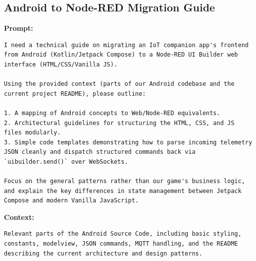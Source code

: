 \subsection*{Android to Node-RED Migration Guide}

\textbf{Prompt:}
\begin{lstlisting}[language={}, breaklines=true]
I need a technical guide on migrating an IoT companion app's frontend from Android (Kotlin/Jetpack Compose) to a Node-RED UI Builder web interface (HTML/CSS/Vanilla JS).

Using the provided context (parts of our Android codebase and the current project README), please outline:

1. A mapping of Android concepts to Web/Node-RED equivalents.
2. Architectural guidelines for structuring the HTML, CSS, and JS files modularly.
3. Simple code templates demonstrating how to parse incoming telemetry JSON cleanly and dispatch structured commands back via `uibuilder.send()` over WebSockets.

Focus on the general patterns rather than our game's business logic, and explain the key differences in state management between Jetpack Compose and modern Vanilla JavaScript.
\end{lstlisting}

\textbf{Context:}
\begin{lstlisting}[language={}, breaklines=true]
Relevant parts of the Android Source Code, including basic styling, constants, modelview, JSON commands, MQTT handling, and the README describing the current architecture and design patterns.
\end{lstlisting}

